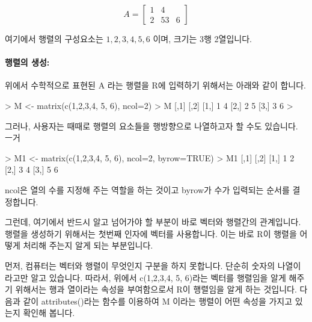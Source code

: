 \begin{equation}
A = 
\begin{bmatrix}
1 & 4 \\
2 & 5 
3 & 6
\end{bmatrix}
\end{equation}

여기에서 행렬의 구성요소는 $1,2,3,4, 5, 6$ 이며, 크기는 3행 2열입니다.

\paragraph{행렬의 생성:} 위에서 수학적으로 표현된 A 라는 행렬을 R에 입력하기 위해서는 아래와 같이 합니다. 

\begin{Schunk}
\begin{Soutput}
> M <- matrix(c(1,2,3,4, 5, 6), ncol=2)
> M
     [,1] [,2]
[1,]    1    4
[2,]    2    5
[3,]    3    6
>
\end{Soutput}
\end{Schunk}

그러나, 사용자는 때때로 행렬의 요소들을 행방향으로 나열하고자 할 수도 있습니다. 
ㅡ거
\begin{Schunk}
\begin{Soutput}
> M1 <- matrix(c(1,2,3,4, 5, 6), ncol=2, byrow=TRUE)
> M1
     [,1] [,2]
[1,]    1    2
[2,]    3    4
[3,]    5    6

\end{Soutput}
\end{Schunk}

ncol은 열의 수를 지정해 주는 역할을 하는 것이고 byrow가 수가 입력되는 순서를 결정합니다.

그런데, 여기에서 반드시 알고 넘어가야 할 부분이 바로 벡터와 행렬간의 관계입니다. 
행렬을 생성하기 위해서는 첫번째 인자에 벡터를 사용합니다. 
이는 바로 R이 행렬을 어떻게 처리해 주는지 알게 되는 부분입니다. 

먼저, 컴퓨터는 벡터와 행렬이 무엇인지 구분을 하지 못합니다. 
단순히 숫자의 나열이라고만 알고 있습니다. 
따라서, 위에서 c(1,2,3,4, 5, 6)라는 벡터를 행렬임을 알게 해주기 위해서는 행과 열이라는 속성을 부여함으로서 
R이 행렬임을 알게 하는 것입니다.
다음과 같이 attributes()라는 함수를 이용하여 M 이라는 행렬이 어떤 속성을 가지고 있는지 확인해 봅니다. 

\begin{Schunk}
\end{Schunk}

